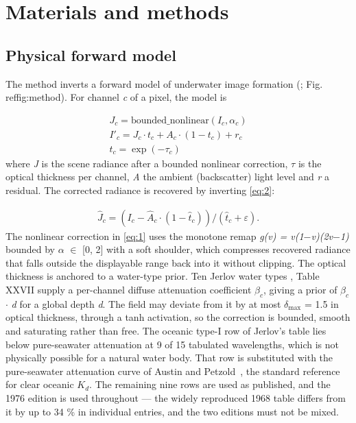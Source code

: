 \documentclass[journal]{IEEEtran}
\begin{document}
\section{Materials and methods}
\subsection{Physical forward model}
The method inverts a forward model of underwater image formation (\cite{mcglamery1980}; Fig.~\\ref{fig:method}). For channel \emph{c} of a pixel, the model is

\begin{align}
J_{c} = \mathrm{bounded\_{nonlinear}}(I_{c}, \alpha _{c})\label{eq:1} \\
I'_{c} = J_{c} \cdot  t_{c} + A_{c} \cdot  (1 - t_{c}) + r_{c}\label{eq:2} \\
t_{c} = \exp(-\tau _{c})\label{eq:3} 
\end{align}
where \emph{J} is the scene radiance after a bounded nonlinear correction, \emph{$\tau$} is the optical thickness per channel, \emph{A} the ambient (backscatter) light level and \emph{r} a residual. The corrected radiance is recovered by inverting \eqref{eq:2}:

\begin{align}
\hat{J}_{c} = (I_{c} - \hat{A}_{c} \cdot  (1 - \hat{t}_{c})) / (\hat{t}_{c} + \varepsilon ).\label{eq:4} 
\end{align}
The nonlinear correction in \eqref{eq:1} uses the monotone remap \emph{g(v) = v(1$-$v)(2v$-$1)} bounded by $\alpha$ $\in$ [0, 2] with a soft shoulder, which compresses recovered radiance that falls outside the displayable range back into it without clipping. The optical thickness is anchored to a water-type prior. Ten Jerlov water types \cite{jerlov1976} , Table XXVII supply a per-channel diffuse attenuation coefficient $\beta_c$, giving a prior of $\beta_c$ $\cdot$ \emph{d} for a global depth \emph{d}. The field may deviate from it by at most $\delta_{\max}$ = 1.5 in optical thickness, through a tanh activation, so the correction is bounded, smooth and saturating rather than free. The oceanic type-I row of Jerlov's table lies below pure-seawater attenuation at 9 of 15 tabulated wavelengths, which is not physically possible for a natural water body. That row is substituted with the pure-seawater attenuation curve of Austin and Petzold~\cite{austin1986kd}, the standard reference for clear oceanic $K_d$. The remaining nine rows are used as published, and the 1976 edition is used throughout --- the widely reproduced 1968 table differs from it by up to 34 \% in individual entries, and the two editions must not be mixed.
\end{document}
